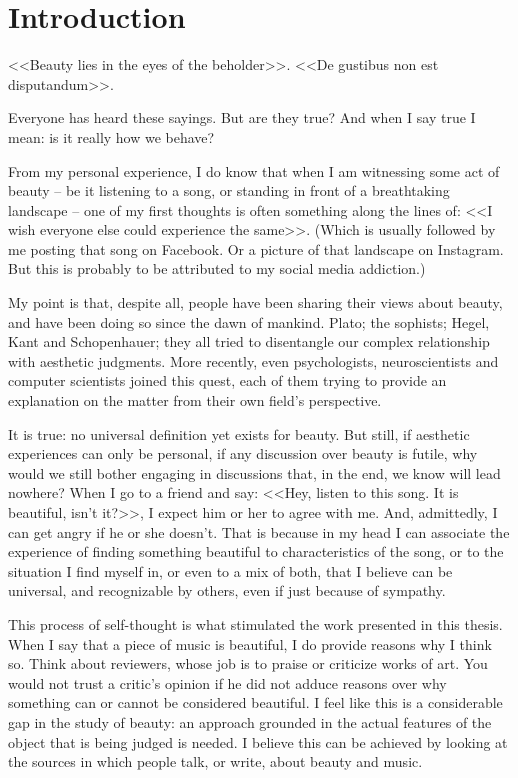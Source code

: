 \chapter{Introduction}\label{ch:intro}
<<Beauty lies in the eyes of the beholder>>. <<De gustibus non est disputandum>>.

Everyone has heard these sayings. But are they true? And when I say true I mean: is it really how we behave?

From my personal experience, I do know that when I am witnessing some act of beauty -- be it listening to a song, or standing in front of a breathtaking landscape -- one of my first thoughts is often something along the lines of: <<I wish everyone else could experience the same>>. (Which is usually followed by me posting that song on Facebook. Or a picture of that landscape on Instagram. But this is probably to be attributed to my social media addiction.)

My point is that, despite all, people have been sharing their views about beauty, and have been doing so since the dawn of mankind. Plato; the sophists; Hegel, Kant and Schopenhauer; they all tried to disentangle our complex relationship with aesthetic judgments. More recently, even psychologists, neuroscientists and computer scientists joined this quest, each of them trying to provide an explanation on the matter from their own field's perspective.

It is true: no universal definition yet exists for beauty. But still, if aesthetic experiences can only be personal, if any discussion over beauty is futile, why would we still bother engaging in discussions that, in the end, we know will lead nowhere? When I go to a friend and say: <<Hey, listen to this song. It is beautiful, isn't it?>>, I expect him or her to agree with me. And, admittedly, I can get angry if he or she doesn't. That is because in my head I can associate the experience of finding something beautiful to characteristics of the song, or to the situation I find myself in, or even to a mix of both, that I believe can be universal, and recognizable by others, even if just because of sympathy.

This process of self-thought is what stimulated the work presented in this thesis. When I say that a piece of music is beautiful, I do provide reasons why I think so. Think about reviewers, whose job is to praise or criticize works of art. You would not trust a critic's opinion if he did not adduce reasons over why something can or cannot be considered beautiful. I feel like this is a considerable gap in the study of beauty: an approach grounded in the actual features of the object that is being judged is needed. I believe this can be achieved by looking at the sources in which people talk, or write, about beauty and music.

